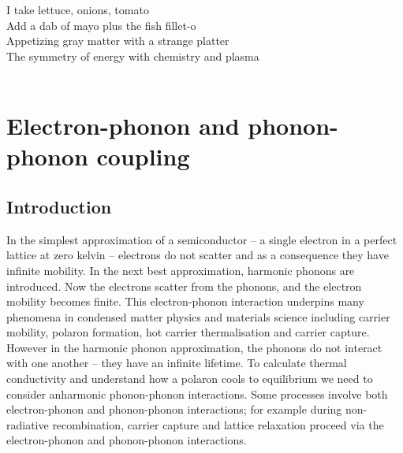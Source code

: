 \begin{savequote}[8cm]
I take lettuce, onions, tomato \\
Add a dab of mayo plus the fish fillet-o \\
Appetizing gray matter with a strange platter \\
The symmetry of energy with chemistry and plasma \\
  \\
\end{savequote}


\chapter{\label{ch:5-epcoupling}Electron-phonon and phonon-phonon coupling}
\section{Introduction} \label{ch5:introduction}

In the simplest approximation of a semiconductor -- a single electron in a perfect lattice at zero kelvin -- electrons do not scatter and as a consequence they have infinite mobility. In the next best approximation, harmonic phonons are introduced. Now the electrons scatter from the phonons, and the electron mobility becomes finite. This electron-phonon interaction underpins many phenomena in condensed matter physics and materials science including carrier mobility, polaron formation, hot carrier thermalisation and carrier capture. However in the harmonic phonon approximation, the phonons do not interact with one another -- they have an infinite lifetime. To calculate thermal conductivity and understand how a polaron cools to equilibrium we need to consider anharmonic phonon-phonon interactions. Some processes involve both electron-phonon and phonon-phonon interactions; for example during non-radiative recombination, carrier capture and lattice relaxation proceed via the electron-phonon and phonon-phonon interactions. 

